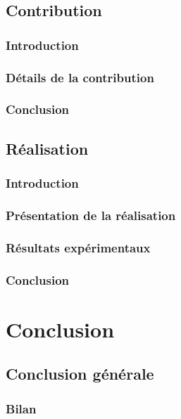 \documentclass[french]{spimutbmphdthesis}
\begin{document}
\chapter{Contribution}

\section{Introduction}

\section{Détails de la contribution}

\section{Conclusion}

\chapter{Réalisation}

\section{Introduction}

\section{Présentation de la réalisation}

\section{Résultats expérimentaux}

\section{Conclusion}

\part{Conclusion}

\chapter{Conclusion générale}
 
\section{Bilan}
\end{document}
